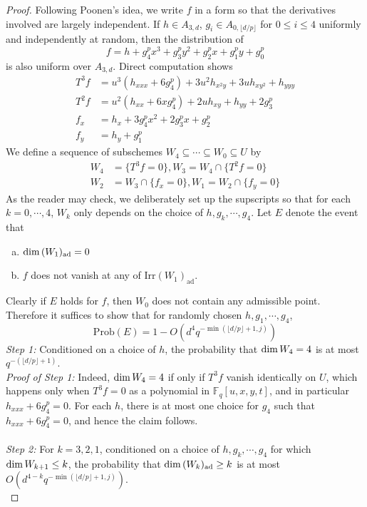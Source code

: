 \documentclass[12pt]{article}
\theoremstyle{plain}
\theoremstyle{definition}
\newcommand{\IF}{\mathbb{F}}
\renewcommand\dim{{\rm dim\,}}
\newcommand{\<}{\langle}
\renewcommand{\>}{\rangle}
\newcommand{\Prob}{\mathrm{Prob}}
\newcommand{\ad}{\mathrm{ad}}
\newcommand{\yk}{\lfloor d/p \rfloor}
\newcommand{\Irr}{\mathrm{Irr}}
\begin{document}
\begin{proof}
Following Poonen's idea, we write $f$ in a form so that the derivatives involved are largely independent. If $h \in A_{3, d}$, $g_i \in A_{0, \yk}$ for $0 \le i \le 4$ uniformly and independently at random, then the distribution of 
$$ f = h + g_4^p x^3  + g_3^p y^2 + g_2^p x + g_1^p y + g_0^p  $$ 
is also uniform over $A_{3, d}$. 
Direct computation shows 
\begin{align*}
T^3 f &= u^3(h_{xxx} + 6 g_4^p) + 3 u^2 h_{x^2 y} + 3 u h_{xy^2} + h_{yyy} \\
T^2 f &= u^2(h_{xx} + 6x g_4^p) + 2 u h_{xy} + h_{yy} + 2 g_3^p \\
f_x &= h_x + 3 g_4^p x^2 + 2 g_3^p x + g_2^p \\
f_y &= h_y + g_1^p
\end{align*}
We define a sequence of subschemes $W_4 \subseteq \cdots \subseteq W_0 \subseteq U$ by 
\begin{align*}
W_4 &= \{ T^3 f = 0 \}, W_3 = W_4 \cap \{ T^2 f = 0 \} \\
W_2 &= W_3 \cap \{ f_x = 0 \}, W_1 = W_2 \cap \{ f_y = 0 \}
\end{align*}
As the reader may check, we deliberately set up the supscripts so that for each $k = 0,\cdots, 4$, $W_k$ only depends on the choice of $h, g_{k}, \cdots, g_4$. Let $E$ denote the event that 
\begin{enumerate}[a.]
\item $\dim (W_1)_\ad = 0$
\item $f$ does not vanish at any of $\Irr (W_1)_\ad$. 
\end{enumerate} 
Clearly if $E$ holds for $f$, then $W_0$ does not contain any admissible point. Therefore it suffices to show that for randomly chosen $h, g_1, \cdots, g_4$,
$$ \Prob(E) = 1 - O(d^4 q^{- \min(\yk + 1, j)})$$
\textit{Step 1:} Conditioned on a choice of $h$, the probability that $\dim W_4 = 4$ is at most $q^{-(\yk + 1)}$. \\
\textit{Proof of Step 1: }Indeed, $\dim W_4 = 4$ if only if $T^3 f$ vanish identically on $U$, which happens only when $T^3 f = 0$ as a polynomial in $\IF_q[u, x, y, t]$, and in particular $h_{xxx} + 6 g_4^p = 0$. For each $h$, there is at most one choice for $g_4$ such that $h_{xxx} + 6 g_4^p = 0$, and hence the claim follows. \\\\
\textit{Step 2:} For $k = 3, 2, 1$, conditioned on a choice of $h, g_k, \cdots, g_4$ for which $\dim W_{k + 1} \le k$, the probability that $\dim (W_k)_\ad \ge k$ is at most $O(d^{4 - k} q^{- \min(\yk + 1, j)})$.\\

\end{proof}
\end{document}
